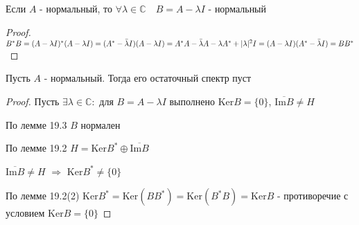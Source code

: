 \documentclass[a4paper,12pt]{report}
\newcommand*{\hm}[1]{#1\nobreak\discretionary{}%
            {\hbox{$\mathsurround=0pt #1$}}{}}
\begin{document}
\begin{lem}
Если $A$ - нормальный, то $\forall\lambda\in\mathbb C\quad B=A-\lambda I$ - нормальный
\end{lem}
\begin{proof}
$B^*B=(A-\lambda I)^*(A-\lambda I)=(A^*-\bar\lambda I)(A-\lambda I)=A^*A\hm-\bar\lambda A-\lambda A^*+|\lambda|^2I=(A-\lambda I)(A^*-\bar\lambda I)=BB^*$
\end{proof}
 


\begin{thm}
Пусть $A$ - нормальный. Тогда его остаточный спектр пуст
\end{thm}
\begin{proof}
Пусть $\exists\lambda\in\mathbb C\colon$ для $B=A-\lambda I$ выполнено $\mathrm{Ker}B=\{0\}$, $\overline{\mathrm{Im}B}\ne H$

По лемме 19.3 $B$ нормален

По лемме 19.2 $H=\mathrm{Ker}B^*\oplus\overline{\mathrm{Im}B}$

$\overline{\mathrm{Im}B}\ne H$ $\Rightarrow$ $\mathrm{Ker}B^*\ne\{0\}$

По лемме 19.2(2) $\mathrm{Ker}B^*=\mathrm{Ker}(BB^*)=\mathrm{Ker}(B^*B)=\mathrm{Ker}B$ - противоречие с условием $\mathrm{Ker}B=\{0\}$
\end{proof}
 
\end{document}
